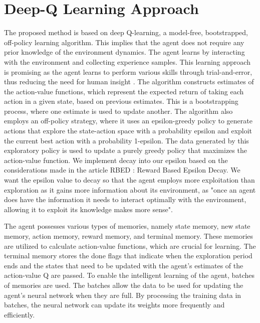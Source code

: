 \documentclass[letterpaper]{article} %
\begin{document}
\section{Deep-Q Learning Approach}

The proposed method is based on deep Q-learning, a model-free, bootstrapped, off-policy learning algorithm. This implies that the agent does not require any prior knowledge of the environment dynamics. The agent learns by interacting with the environment and collecting experience samples. This learning approach is promising as the agent learns to perform various skills through trial-and-error, thus reducing the need for human insight \cite{2018-TOG-deepMimic}. The algorithm constructs estimates of the action-value functions, which represent the expected return of taking each action in a given state, based on previous estimates. This is a bootstrapping process, where one estimate is used to update another. The algorithm also employs an off-policy strategy, where it uses an epsilon-greedy policy to generate actions that explore the state-action space with a probability epsilon and exploit the current best action with a probability 1-epsilon. The data generated by this exploratory policy is used to update a purely greedy policy that maximizes the action-value function. We implement decay into our epsilon based on the considerations made in the article RBED : Reward Based Epsilon Decay\cite{maroti_2019_rbed}. We want the epsilon value to decay so that the agent employs more exploitation than exploration as it gains more information about its environment, as "once an agent does have the information it
needs to interact optimally with the environment, allowing it to exploit its knowledge makes more sense"\cite{maroti_2019_rbed}.  

\par The agent possesses various types of memories, namely state memory, new state memory, action memory, reward memory, and terminal memory. These memories are utilized to calculate action-value functions, which are crucial for learning. The terminal memory stores the done flags that indicate when the exploration period ends and the states that need to be updated with the agent's estimates of the action-value Q are passed. To enable the intelligent learning of the agent, batches of memories are used. The batches allow the data to be used for updating the agent's neural network when they are full. By processing the training data in batches, the neural network can update its weights more frequently and efficiently.
\end{document}

